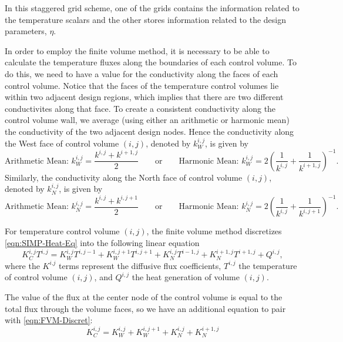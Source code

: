 In this staggered grid scheme, one of the grids contains the information related to the temperature scalars and the other stores information related to the design parameters, $\eta$.

In order to employ the finite volume method, it is necessary to be able to calculate the temperature fluxes along the boundaries of each control volume. To do this, we need to have a value for the conductivity along the faces of each control volume. Notice that the faces of the temperature control volumes lie within two adjacent design regions, which implies that there are two different conductivites along that face. To create a consistent conductivity along the control volume wall, we average (using either an arithmetic or harmonic mean) the conductivity of the two adjacent design nodes. Hence the conductivity along the West face of control volume $(i,j)$, denoted by $k^{i,j}_W$, is given by
\begin{equation}
	\text{Arithmetic Mean: }k^{i,j}_W=\frac{k^{i,j}+k^{i+1,j}}{2}\qquad\text{or}\qquad\text{Harmonic Mean: }k^{i,j}_W=2\left(\frac{1}{k^{i,j}}+\frac{1}{k^{i+1,j}}\right)^{-1}.\label{eqn:k_W-Average-Filter}
\end{equation}
Similarly, the conductivity along the North face of control volume $(i,j)$, denoted by $k^{i,j}_N$, is given by
\begin{equation}
	\text{Arithmetic Mean: }k^{i,j}_N=\frac{k^{i,j}+k^{i,j+1}}{2}\qquad\text{or}\qquad\text{Harmonic Mean: }k^{i,j}_N=2\left(\frac{1}{k^{i,j}}+\frac{1}{k^{i,j+1}}\right)^{-1}.\label{eqn:k_N-Average-Filter}
\end{equation}

For temperature control volume $(i,j)$, the finite volume method discretizes \eqref{eqn:SIMP-Heat-Eq} into the following linear equation
\begin{equation}
	K^{i,j}_C T^{i,j}=K_W^{i,j}T^{i,j-1}+K_W^{i,j+1}T^{i,j+1}+K_N^{i,j}T^{i-1,j}+K_N^{i+1,j}T^{i+1,j}+Q^{i,j},\label{eqn:FVM-Discret}
\end{equation}
where the $K^{i.j}$ terms represent the diffusive flux coefficients, $T^{i,j}$ the temperature of control volume $(i,j)$, and $Q^{i,j}$ the heat generation of volume $(i,j)$.

The value of the flux at the center node of the control volume is equal to the total flux through the volume faces, so we have an additional equation to pair with \eqref{eqn:FVM-Discret}:
\begin{equation}
	K^{i,j}_C=K_W^{i,j}+K_W^{i,j+1}+K_N^{i,j}+K_N^{i+1,j}\label{eqn:CenterFluxCoeff}
\end{equation}

